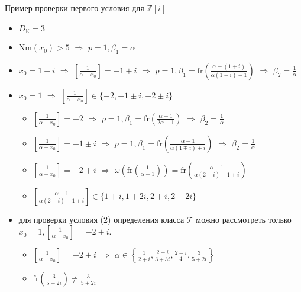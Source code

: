 \documentclass[8pt, xcolor=x11names]{beamer}
\begin{document}
\begin{frame}
    \begin{block}{Пример проверки первого условия для $\mathbb{Z}[i]$}
        \begin{itemize}
            \item $D_{\mathbb{K}} = 3$

            \item $\textrm{Nm}(x_0) > 5$ $\Rightarrow$ $p = 1, \beta_1 = \alpha$
            
            \item $x_0 = 1 + i$ $\Rightarrow$ $\left[\frac{1}{\alpha - x_0}\right] = -1 + i$ $\Rightarrow$ $p = 1, \beta_1 = \textrm{fr}\left(\frac{\alpha - (1 + i)}{\alpha(1 - i) - 1}\right)$ $\Rightarrow$ $\beta_2 = \frac{1}{\alpha}$
            
            \item $x_0 = 1$ $\Rightarrow$ $\left[\frac{1}{\alpha - x_0}\right] \in \{-2, -1 \pm i, -2 \pm i\}$
            \begin{itemize}
                \item $\left[\frac{1}{\alpha - x_0}\right] = -2$ $\Rightarrow$ $p = 1, \beta_1 = \textrm{fr}\left(\frac{\alpha - 1}{2\alpha - 1}\right)$ $\Rightarrow$ $\beta_2 = \frac{1}{\alpha}$

                \item $\left[\frac{1}{\alpha - x_0}\right] = -1 \pm i$ $\Rightarrow$ $p = 1, \beta_1 = \textrm{fr}\left(\frac{\alpha - 1}{\alpha(1 \mp i) \pm i}\right)$ $\Rightarrow$ $\beta_2 = \frac{1}{\alpha}$

                \item $\left[\frac{1}{\alpha - x_0}\right] = -2 + i$ $\Rightarrow$ $\omega\left(\textrm{fr}\left(\frac{1}{\alpha - 1}\right)\right) = \textrm{fr}\left(\frac{\alpha - 1}{\alpha(2 - i) - 1 + i}\right)$
                
                \item $\left[\frac{\alpha - 1}{\alpha(2 - i) - 1 + i}\right] \in \{1 + i, 1 + 2i, 2 + i, 2 + 2i\}$
            \end{itemize}
            
            \item для проверки условия (2) определения класса $\mathcal{T}$ можно рассмотреть только $x_0 = 1, \left[\frac{1}{\alpha - x_0}\right] = -2 \pm i$.
            \begin{itemize}
                \item $\left[\frac{1}{\alpha - x_0}\right] = -2 + i$ $\Rightarrow$ $\alpha \in \left\{\frac{1}{2 + i}, \frac{2 + i}{3 + 3i}, \frac{2 - i}{4}, \frac{3}{5 + 2i}\right\}$
                
                \item $\textrm{fr}\left(\frac{3}{5 + 2i}\right) \neq \frac{3}{5 + 2i}$
            \end{itemize}
        \end{itemize}
    \end{block}
\end{frame}
\end{document}
